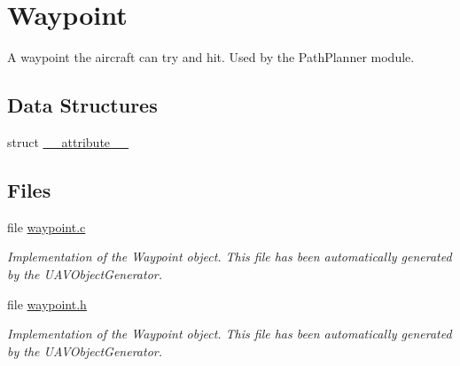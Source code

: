 \hypertarget{group___waypoint}{\section{\-Waypoint}
\label{group___waypoint}
}


\-A waypoint the aircraft can try and hit. \-Used by the \-Path\-Planner module.  


\subsection*{\-Data \-Structures}
\begin{DoxyCompactItemize}
\item 
struct \hyperlink{struct____attribute____}{\-\_\-\-\_\-attribute\-\_\-\-\_\-}
\end{DoxyCompactItemize}
\subsection*{\-Files}
\begin{DoxyCompactItemize}
\item 
file \hyperlink{waypoint_8c}{waypoint.\-c}
\begin{DoxyCompactList}\small\item\em \-Implementation of the \-Waypoint object. \-This file has been automatically generated by the \-U\-A\-V\-Object\-Generator. \end{DoxyCompactList}\item 
file \hyperlink{waypoint_8h}{waypoint.\-h}
\begin{DoxyCompactList}\small\item\em \-Implementation of the \-Waypoint object. \-This file has been automatically generated by the \-U\-A\-V\-Object\-Generator. \end{DoxyCompactList}\end{DoxyCompactItemize}
